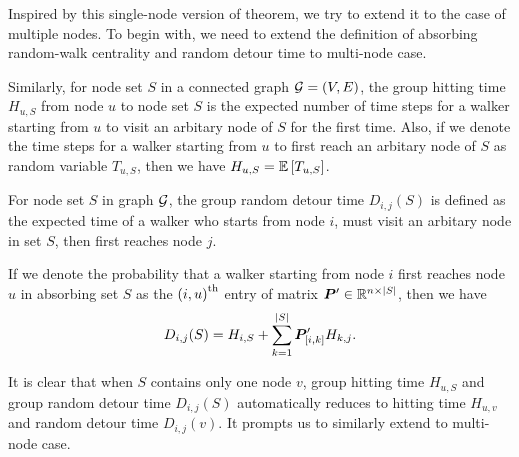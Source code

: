 \documentclass[sigconf]{acmart}
\begin{document}
Inspired by this single-node version of theorem, we try to extend it to the case of multiple nodes.
To begin with, we need to extend the definition of absorbing random-walk centrality and random detour time to multi-node case.

Similarly, for node set \(S\) in a connected graph \(\mathcal{G}=(V,E)\), the group hitting time \(H_{u,S}\) from node \(u\) to node set \(S\) is the expected number of time steps for a walker starting from \(u\) to visit an arbitary node of \(S\) for the first time.
Also, if we denote the time steps for a walker starting from \(u\) to first reach an arbitary node of \(S\) as random variable \(T_{u,S}\), then we have \(H_{u,S}=\mathbb{E}\left[T_{u,S}\right]\).

For node set \(S\) in graph \(\mathcal{G}\), the group random detour time \(D_{i,j}(S)\) is defined as the expected time of a walker who starts from node \(i\), must visit an arbitary node in set \(S\), then first reaches node \(j\).

\begin{definition}\label{def:detour-multiple}
    If we denote the probability that a walker starting from node \(i\) first reaches node \(u\) in absorbing set \(S\) as the \({(i,u)}^{\rm{th}}\) entry of matrix \(\boldsymbol{P}'\in\mathbb{R}^{n\times\left|S \right|}\), then we have
    \[D_{i,j}(S)= H_{i,S}+\sum_{k=1}^{\left|S \right|}\boldsymbol{P}'_{[i,k]}H_{k,j}.\]
\end{definition}

It is clear that when \(S\) contains only one node \(v\), group hitting time \(H_{u,S}\) and group random detour time \(D_{i,j}(S)\) automatically reduces to hitting time \(H_{u,v}\) and random detour time \(D_{i,j}(v)\).
It prompts us to similarly extend  to multi-node case.
\end{document}
